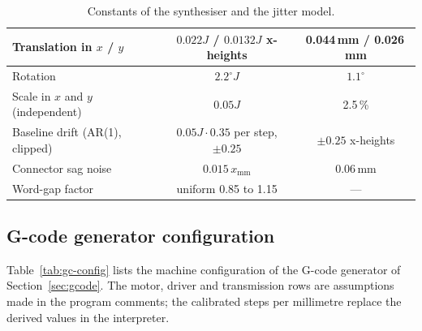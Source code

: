 \begin{table}[h]
\begin{tabularx}{\linewidth}{|X|c|c|}
\hline
Translation in $x$ / $y$ & $0.022J$ / $0.0132J$ x-heights & 0.044\,mm / 0.026\,mm \\
\hline
Rotation & $2.2^\circ J$ & $1.1^\circ$ \\
\hline
Scale in $x$ and $y$ (independent) & $0.05J$ & 2.5\,\% \\
\hline
Baseline drift (AR(1), clipped) & $0.05J\cdot0.35$ per step, $\pm0.25$ & $\pm0.25$ x-heights \\
\hline
Connector sag noise & $0.015\,x_{\mathrm{mm}}$ & 0.06\,mm \\
\hline
Word-gap factor & uniform 0.85 to 1.15 & --- \\
\hline
\end{tabularx}
\caption{Constants of the synthesiser and the jitter model.}
\label{tab:syn-const}
\end{table}

\subsection{G-code generator configuration}

Table~\ref{tab:gc-config} lists the machine configuration of the G-code generator of Section~\ref{sec:gcode}.
The motor, driver and transmission rows are assumptions made in the program comments; the calibrated steps per millimetre replace the derived values in the interpreter.

